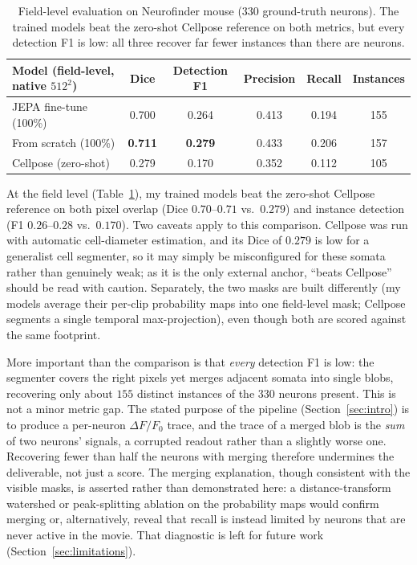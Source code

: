 \documentclass[twoside,11pt]{article}
\begin{document}
\begin{table}[t]
\centering
\begin{tabular}{lccccc}
\toprule
Model (field-level, native $512^2$) & Dice & Detection F1 & Precision & Recall & Instances \\
\midrule
JEPA fine-tune (100\%)      & 0.700 & 0.264 & 0.413 & 0.194 & 155 \\
From scratch (100\%)        & \textbf{0.711} & \textbf{0.279} & 0.433 & 0.206 & 157 \\
Cellpose (zero-shot)        & 0.279 & 0.170 & 0.352 & 0.112 & 105 \\
\bottomrule
\end{tabular}
\caption{Field-level evaluation on Neurofinder mouse ($330$ ground-truth neurons). The trained models
beat the zero-shot Cellpose reference on both metrics, but every detection F1 is low: all three
recover far fewer instances than there are neurons.}
\label{tab:field}
\end{table}

At the field level (Table~\ref{tab:field}), my trained models beat the zero-shot Cellpose reference on
both pixel overlap (Dice $0.70$--$0.71$ vs.\ $0.279$) and instance detection (F1 $0.26$--$0.28$ vs.\
$0.170$). Two caveats apply to this comparison. Cellpose was run with automatic cell-diameter
estimation, and its Dice of $0.279$ is low for a generalist cell segmenter, so it may simply be
misconfigured for these somata rather than genuinely weak; as it is the only external anchor,
``beats Cellpose'' should be read with caution. Separately, the
two masks are built differently (my models average their per-clip probability maps into one
field-level mask; Cellpose segments a single temporal max-projection), even though both are scored
against the same footprint.

More important than the comparison is that \emph{every} detection F1 is low: the segmenter covers the
right pixels yet merges adjacent somata into single blobs, recovering only about $155$ distinct
instances of the $330$ neurons present. This is not a minor metric gap. The stated purpose of the
pipeline (Section~\ref{sec:intro}) is to produce a per-neuron $\Delta F/F_0$ trace, and the trace of a
merged blob is the \emph{sum} of two neurons' signals, a corrupted readout rather than a slightly
worse one. Recovering fewer than half the neurons with merging therefore undermines the deliverable,
not just a score. The merging explanation, though consistent with the visible
masks, is asserted rather than demonstrated here: a distance-transform watershed or peak-splitting
ablation on the probability maps would confirm merging or, alternatively, reveal that recall is
instead limited by neurons that are never active in the movie. That diagnostic is left for future work
(Section~\ref{sec:limitations}).
\end{document}
